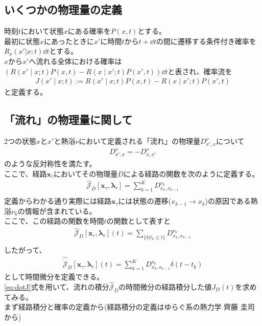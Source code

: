 \documentclass{ltjsarticle}
\begin{document}
\subsection{いくつかの物理量の定義}
時刻$t$において状態$x$にある確率を$P(x,t)$とする。\\
最初に状態$x$にあったときに$x'$に時間$t$から$t+\dd{t}$の間に遷移する条件付き確率を$R_\nu(x'|x;t)\dd{t}$とする。\\
$x$から$x'$へ流れる全体における確率は$\left( R(x'\mid x;t)P(x,t)-R(x\mid x';t)P(x',t) \right)\dd{t} $と表され、確率流を
\begin{align}
  J(x'\mid x;t):=R(x'\mid x;t)P(x,t)-R(x\mid x';t)P(x',t)
\end{align}
と定義する。\\
\subsection{「流れ」の物理量に関して}
2つの状態$x$と$x'$と熱浴$\nu$において定義される「流れ」の物理量$D^\nu_{x',x}$について\\
\begin{align}
  D^\nu_{x',x}=-D^\nu_{x,x'}
\end{align}
のような反対称性を満たす。\\
ここで、経路$\bm{x}_\tau$においてその物理量$D$による経路の関数を次のように定義する。
\begin{align}
  \hat{\mathcal{J}}_D[\bm{x}_\tau,\bm{\lambda}_\tau]=\sum^K_{k=1}D^{\nu_k}_{x_k,x_{k-1}}\\
\end{align}
定義からわかる通り実際には経路$\bm{x}_\tau$には状態の遷移($x_{k-1}\to x_k$)の原因である熱浴$\nu_k$の情報が含まれている。\\
ここで、この経路の関数を時間$t$の関数として表すと
\begin{align}
  \hat{\mathcal{J}}_D[\bm{x}_\tau,\bm{\lambda}_\tau](t)=\sum_{\lbrace k|t_k \le t\rbrace}D^{\nu_k}_{x_k,x_{k-1}}\\
\end{align}
したがって、
\begin{align}
  \hat{\dot{\mathcal{J}}}_D[\bm{x}_\tau,\bm{\lambda}_\tau](t)=\sum_{k=1}^K D^{\nu_k}_{x_{k},x_{k-1}}\delta(t-t_k)\label{eq:dotJ}
\end{align}
として時間微分を定義できる。\\
\eqref{eq:dotJ}式を用いて、流れの積分$\hat{\mathcal{J}}_D$の時間微分の経路積分した値$J_D(t)$を求めてみる。\\
まず経路積分と確率の定義から(経路積分の定義はゆらぐ系の熱力学 齊藤 圭司から)\\
\end{document}
